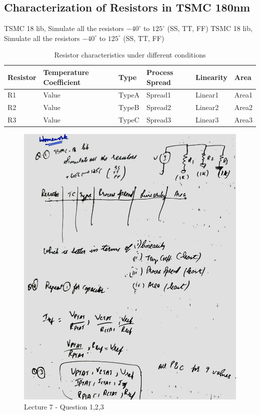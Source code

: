 \documentclass[a4paper]{article}
\begin{document}
\subsection{Characterization of Resistors in TSMC 180nm}
TSMC 18 lib, Simulate all the resistors $-40^\circ$ to $125^\circ$ (SS, TT, FF)
TSMC 18 lib, Simulate all the resistors $-40^\circ$ to $125^\circ$ (SS, TT, FF)
\begin{table}[ht]
\centering
\begin{tabular}{|l|l|l|l|l|l|}
\hline
Resistor & Temperature Coefficient & Type & Process Spread & Linearity & Area \\
\hline
R1 & Value & TypeA & Spread1 & Linear1 & Area1 \\
R2 & Value & TypeB & Spread2 & Linear2 & Area2 \\
R3 & Value & TypeC & Spread3 & Linear3 & Area3 \\
\hline
\end{tabular}
\caption{Resistor characteristics under different conditions}
\end{table}
\begin{figure}
    \centering
    \includegraphics[width=0.8\linewidth]{images/Lec_7_Q_1_2_3.jpeg}
    \caption{Lecture 7 - Question 1,2,3}
\end{figure}
\end{document}
